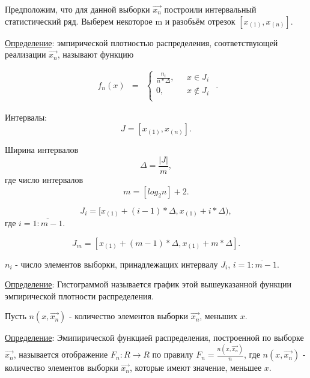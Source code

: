 \documentclass[12pt,a4paper]{scrartcl}
\begin{document}
Предположим, что для данной выборки $\overrightarrow {x_n}$ построили интервальный статистический ряд. Выберем некоторое m и разобьём отрезок $[x_{(1)}, x_{(n)}]$.

\underline {Определение}: эмпирической плотностью распределения, соответствующей реализации $\overrightarrow {x_n}$, называют функцию

\begin{equation}\label{eq1.6}
\begin{matrix}
f_n(x) & =
& \left\{
\begin{matrix}
\frac {n_i} {n * \Delta}, & \mbox{ } x \in J_i \\
0, & \mbox{ } x \notin J_i \\
\end{matrix} \right.
\end{matrix} .
\end{equation}

Интервалы:
\begin{equation}\label{eq1.7}
J = [x_{(1)},x_{(n)}] .
\end{equation}

Ширина интервалов
\begin{equation}\label{eq1.8}
\Delta = \frac {|J|} {m} ,
\end{equation}
где число интервалов
\begin{equation}\label{eq1.9}
m = [log_2n] + 2 .
\end{equation}

\begin{equation}\label{eq1.10}
J_i = [x_{(1)} + (i - 1) * \Delta, x_{(1)} + i * \Delta) , 
\end{equation}
где $i = \overline {1:m - 1}$.

\begin{equation}\label{eq1.11}
J_m = [x_{(1)} + (m - 1) * \Delta, x_{(1)} + m * \Delta] .
\end{equation}

$n_i$ - число элементов выборки, принадлежащих интервалу $J_i$, $i = \overline {1: m - 1}$.

\underline {Определение}: Гистограммой называется график этой вышеуказанной функции эмпирической плотности распределения.

Пусть $n(x, \overrightarrow {x_n})$ - количество элементов выборки $\overrightarrow {x_n}$, меньших $x$.

\underline {Определение}: Эмипирической функцией распределения, построенной по выборке $\overrightarrow {x_n}$, называется отображение $F_n: R \to R$ по правилу $F_n = \frac {n(x, \overrightarrow {x_n})} {n}$, где $n(x, \overrightarrow {x_n})$ - количество элементов выборки $\overrightarrow {x_n}$, которые имеют значение, меньшее $x$.
\end{document}
